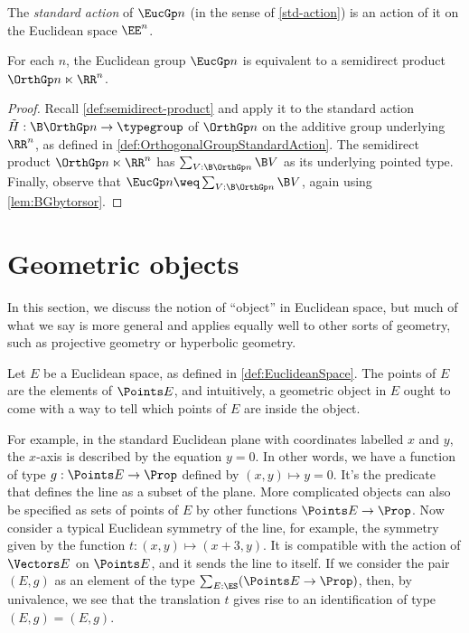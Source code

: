 The {\em standard action} of $\EucGp n$ (in the sense of \cref{std-action}) is
an action of it on the Euclidean space $\EE^n$.

\begin{theorem}\label{thm:EuclideanGroupSemidirect}
  For each $n$, the Euclidean group $\EucGp n$ is equivalent to a semidirect
  product $\OrthGp n \ltimes \RR^n$.
\end{theorem}

\begin{proof}
  Recall \cref{def:semidirect-product} and apply it to the standard action
  $\tilde H : \B \OrthGp n \to \typegroup$ of $\OrthGp n$ on the additive group
  underlying $\RR^n$, as defined in \cref{def:OrthogonalGroupStandardAction}.
  The semidirect product $\OrthGp n \ltimes \RR^n$ has
  $\sum_{V:\B \OrthGp n} \B V$ as its underlying pointed type.
  Finally, observe that $\EucGp n \weq \sum_{V:\B \OrthGp n} \B V$, again
  using \cref{lem:BGbytorsor}.
\end{proof}

\section{Geometric objects}

In this section, we discuss the notion of ``object'' in Euclidean space, but
much of what we say is more general and applies equally well to other sorts of
geometry, such as projective geometry or hyperbolic geometry.

Let $E$ be a Euclidean space, as defined in \cref{def:EuclideanSpace}.  The
points of $E$ are the elements of $\Points E$, and intuitively, a geometric
object in $E$ ought to come with a way to tell which points of $E$ are inside
the object.

For example, in the standard Euclidean plane with coordinates labelled $x$ and
$y$, the $x$-axis is described by the equation $y=0$.  In other words, we have
a function of type $g : \Points E \to \Prop$ defined by $(x,y) \mapsto y=0$.
It's the predicate that defines the line as a subset of the plane.  More
complicated objects can also be specified as sets of points of $E$ by other
functions $\Points E \to \Prop$.  Now consider a typical Euclidean symmetry of
the line, for example, the symmetry given by the function $t : (x,y) \mapsto (x+3,y)$.
It is compatible with the action of $\Vectors E$ on $\Points E$, and it sends
the line to itself.  If we consider the pair $(E,g)$ as an element of the type
$\sum_{E:\ES} (\Points E \to \Prop)$, then, by univalence, we see that the
translation $t$ gives rise to an identification of type $(E,g) = (E,g)$.

